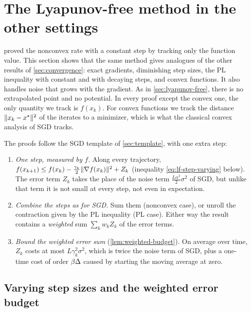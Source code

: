 \section{The Lyapunov-free method in the other settings}\label{sec:lf-all}

 proved the nonconvex rate with a constant step by tracking only
the function value. This section shows that the same method gives analogues of the other results of
\cref{sec:convergence}: exact gradients, diminishing step sizes, the PL inequality with
constant and with decaying steps, and convex functions. It also handles noise that grows
with the gradient. As in \cref{sec:lyapunov-free}, there is no extrapolated point and no
potential. In every proof except the convex one, the only quantity we track is $f(x_k)$.
For convex functions we track the distance $\lVert x_k-x^\star\rVert^2$ of the iterates to a
minimizer, which is what the classical convex analysis of SGD tracks.

The proofs follow the SGD template of \cref{sec:template}, with one extra step:
\begin{enumerate}[label=\textbf{(L\arabic*)}]
\item \emph{One step, measured by $f$.} Along every trajectory,
  $f(x_{k+1})\le f(x_k)-\frac{\gamma_k}{2}\lVert \nabla f(x_k)\rVert^2+Z_k$ (inequality
  \eqref{eq:lf-step-varying} below). The error term $Z_k$ takes the place of the noise
  term $\frac{L\alpha^2}{2}\sigma^2$ of SGD, but unlike that term it is not small at every
  step, not even in expectation.
\item \emph{Combine the steps as for SGD.} Sum them (nonconvex case), or unroll the
  contraction given by the PL inequality (PL case). Either way the result contains a
  \emph{weighted} sum $\sum_kw_kZ_k$ of the error terms.
\item \emph{Bound the weighted error sum} (\cref{lem:weighted-budget}). On average over
  time, $Z_k$ costs at most $L\gamma_k^2\sigma^2$, which is twice the noise term of SGD,
  plus a one-time cost of order $\beta\Delta$ caused by starting the moving average at zero.
\end{enumerate}

\subsection{Varying step sizes and the weighted error budget}

